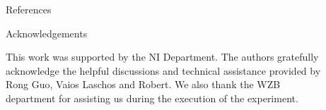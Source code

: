 \documentclass[final]{beamer}
\newlength{\sepwid}
\newlength{\onecolwid}
\begin{document}
\begin{frame}
\begin{columns}[t]
\begin{column}{\onecolwid}

\begin{exampleblock}{References}

\nocite{*} %
\small{
\vspace{1cm}}
\end{exampleblock}






\begin{block}{Acknowledgements}

This work was supported by the NI Department. The authors gratefully acknowledge the helpful discussions and technical assistance provided by Rong Guo, Vaios Laschos and Robert.
We also thank the WZB department for assisting us during the execution of the experiment.

\end{block}


\end{column} %

\begin{column}{\sepwid}\end{column} %

\begin{column}{\onecolwid} %



\end{column}
\end{columns}
\end{frame}
\end{document}
